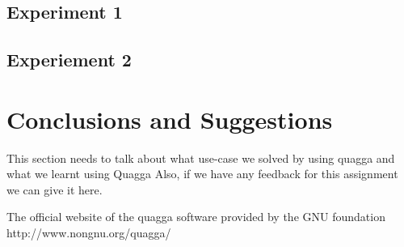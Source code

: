 \documentclass{article}
\begin{document}
\subsection{Experiment 1}
\subsection{Experiement 2}
\clearpage
\section{Conclusions and Suggestions}
This section needs to talk about what use-case we solved by using quagga and what we learnt using Quagga
Also, if we have any feedback for this assignment we can give it here.
%
%
\begin{thebibliography}{9}
  The official website of the quagga software provided by the GNU foundation http://www.nongnu.org/quagga/
\end{thebibliography}
\end{document}
